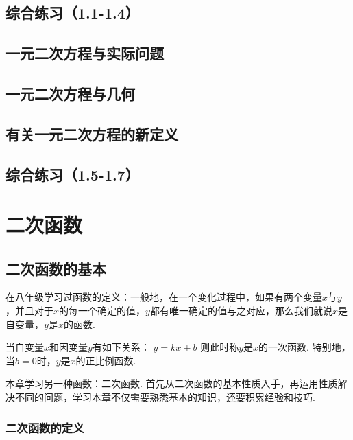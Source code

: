\documentclass[lang=cn, 10pt, titlestyle=display, oneside]{elegantbook}
\begin{document}
\section{综合练习（1.1-1.4）}





\section{一元二次方程与实际问题}

\section{一元二次方程与几何}

\section{有关一元二次方程的新定义}

\section{综合练习（1.5-1.7）}



\chapter{二次函数}

\section{二次函数的基本}

在八年级学习过函数的定义：一般地，在一个变化过程中，如果有两个变量\(x\)与\(y\)，并且对于\(x\)的每一个确定的值，\(y\)都有唯一确定的值与之对应，那么我们就说\(x\)是自变量，\(y\)是\(x\)的函数.
\par
当自变量\(x\)和因变量\(y\)有如下关系：
\(y=kx+b\)
则此时称\(y\)是\(x\)的一次函数. 特别地，当\(b=0\)时，\(y\)是\(x\)的正比例函数.
\par
本章学习另一种函数：二次函数. 首先从二次函数的基本性质入手，再运用性质解决不同的问题，学习本章不仅需要熟悉基本的知识，还要积累经验和技巧.


\subsection{二次函数的定义}
\end{document}
